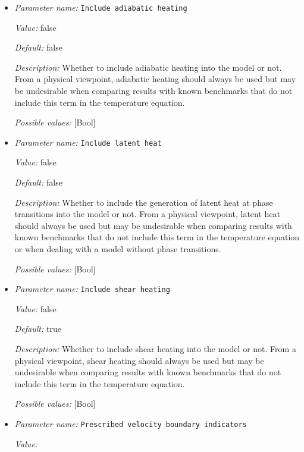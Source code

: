 \begin{itemize}
{\it Possible values:} [List list of <[Integer range 0...2147483647 (inclusive)]> of length 0...4294967295 (inclusive)]
\item {\it Parameter name:} {\tt Include adiabatic heating}


{\it Value:} false


{\it Default:} false


{\it Description:} Whether to include adiabatic heating into the model or not. From a physical viewpoint, adiabatic heating should always be used but may be undesirable when comparing results with known benchmarks that do not include this term in the temperature equation.


{\it Possible values:} [Bool]
\item {\it Parameter name:} {\tt Include latent heat}


{\it Value:} false


{\it Default:} false


{\it Description:} Whether to include the generation of latent heat at phase transitions into the model or not. From a physical viewpoint, latent heat should always be used but may be undesirable when comparing results with known benchmarks that do not include this term in the temperature equation or when dealing with a model without phase transitions.


{\it Possible values:} [Bool]
\item {\it Parameter name:} {\tt Include shear heating}


{\it Value:} false


{\it Default:} true


{\it Description:} Whether to include shear heating into the model or not. From a physical viewpoint, shear heating should always be used but may be undesirable when comparing results with known benchmarks that do not include this term in the temperature equation.


{\it Possible values:} [Bool]
\item {\it Parameter name:} {\tt Prescribed velocity boundary indicators}


{\it Value:} 



\end{itemize}
